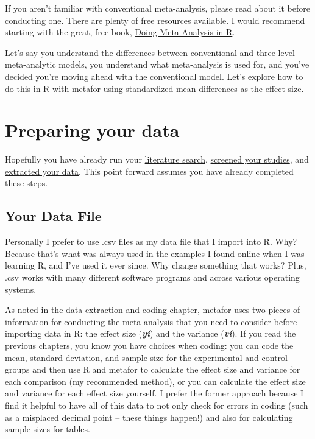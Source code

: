 \documentclass[
]{book}
\begin{document}
If you aren't familiar with conventional meta-analysis, please read about it before conducting one. There are plenty of free resources available. I would recommend starting with the great, free book, \href{https://bookdown.org/MathiasHarrer/Doing_Meta_Analysis_in_R/}{Doing Meta-Analysis in R}\citep{harrer2021}.

Let's say you understand the differences between conventional and three-level meta-analytic models, you understand what meta-analysis is used for, and you've decided you're moving ahead with the conventional model. Let's explore how to do this in R with metafor\citep{viechtbauer2010} using standardized mean differences as the effect size.

\hypertarget{preparing-your-data}{%
\section{Preparing your data}\label{preparing-your-data}}

Hopefully you have already run your \protect\hyperlink{literaturesearch}{literature search}, \protect\hyperlink{screening}{screened your studies}, and \protect\hyperlink{data}{extracted your data}. This point forward assumes you have already completed these steps.

\hypertarget{your-data-file}{%
\subsection{Your Data File}\label{your-data-file}}

Personally I prefer to use .csv files as my data file that I import into R. Why? Because that's what was always used in the examples I found online when I was learning R, and I've used it ever since. Why change something that works? Plus, .csv works with many different software programs and across various operating systems. ~

As noted in the \protect\hyperlink{data}{data extraction and coding chapter}, metafor uses two pieces of information for conducting the meta-analysis that you need to consider before importing data in R: the effect size (\textbf{\emph{yi}}) and the variance (\textbf{\emph{vi}}). If you read the previous chapters, you know you have choices when coding: you can code the mean, standard deviation, and sample size for the experimental and control groups and then use R and metafor to calculate the effect size and variance for each comparison (my recommended method), or you can calculate the effect size and variance for each effect size yourself. I prefer the former approach because I find it helpful to have all of this data to not only check for errors in coding (such as a misplaced decimal point -- these things happen!) and also for calculating sample sizes for tables.
\end{document}
